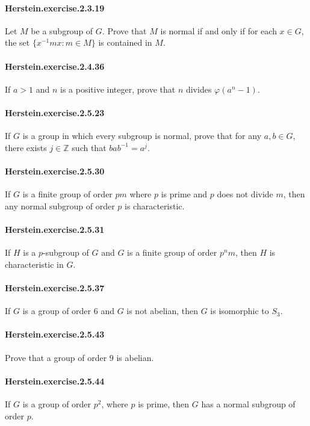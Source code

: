 \documentclass{article}
\begin{document}
\paragraph{Herstein.exercise.2.3.19} Let $M$ be a subgroup of $G$. Prove that $M$ is normal if and only if for each $x\in G$, the set $\{x^{-1}mx: m\in M\}$ is contained in $M$.

\paragraph{Herstein.exercise.2.4.36} If $a>1$ and $n$ is a positive integer, prove that $n$ divides $\varphi(a^n-1)$.

\paragraph{Herstein.exercise.2.5.23} If $G$ is a group in which every subgroup is normal, prove that for any $a, b \in G$, there exists $j \in \mathbb{Z}$ such that $bab^{-1} = a^j$.

\paragraph{Herstein.exercise.2.5.30} If $G$ is a finite group of order $pm$ where $p$ is prime and $p$ does not divide $m$, then any normal subgroup of order $p$ is characteristic.

\paragraph{Herstein.exercise.2.5.31} If $H$ is a $p$-subgroup of $G$ and $G$ is a finite group of order $p^nm$, then $H$ is characteristic in $G$.

\paragraph{Herstein.exercise.2.5.37} If $G$ is a group of order $6$ and $G$ is not abelian, then $G$ is isomorphic to $S_3$.

\paragraph{Herstein.exercise.2.5.43} Prove that a group of order $9$ is abelian.

\paragraph{Herstein.exercise.2.5.44} If $G$ is a group of order $p^2$, where $p$ is prime, then $G$ has a normal subgroup of order $p$.
\end{document}
